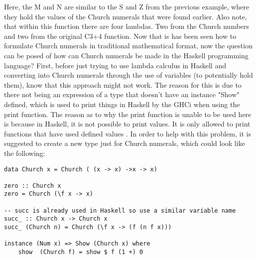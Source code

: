 \documentclass{article}
\begin{document}
Here, the M and N are similar to the S and Z from the previous example, where they hold the values of the Church numerals that were found earlier. Also note, that within this function there are four lambdas. Two from the Church numbers and two from the original C3+4 function.
Now that is has been seen how to formulate Church numerals in traditional mathematical format, now the question can be posed of how can Church numerals be made in the Haskell programming language?
First, before just trying to use lambda calculus in Haskell and converting into Church numerals through the use of variables (to potentially hold them), know that this approach might not work.
The reason for this is due to there not being an expression of a type that doesn't have  an instance "Show" defined, which is used to print things in Haskell by the GHCi when using the print function.
The reason as to why the print function is unable to be used here is because in Haskell, it is not possible to print values.
It is only allowed to print functions that have used defined values \cite{14}.
In order to help with this problem, it is suggested to create a new type just for Church numerals, which could look like the following:
\begin{lstlisting}
data Church x = Church ( (x -> x) ->x -> x)

zero :: Church x
zero = Church (\f x -> x)

-- succ is already used in Haskell so use a similar variable name
succ_ :: Church x -> Church x
succ_ (Church n) = Church (\f x -> (f (n f x)))

instance (Num x) => Show (Church x) where
    show  (Church f) = show $ f (1 +) 0
\end{lstlisting}
\end{document}
